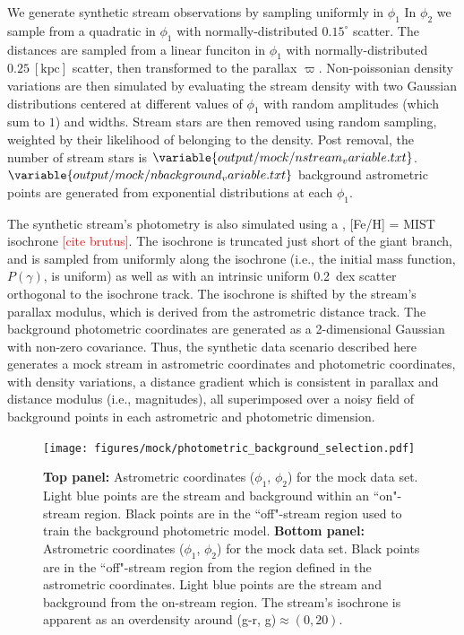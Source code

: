 \documentclass[twocolumn]{aastex631}
\newcommand{\unit}[1]{[\text{#1}]}
\newcommand{\parallax}{\varpi}
\newcommand{\TODO}[1]{{\textcolor{red}{#1}}}
\begin{document}
    We generate synthetic stream observations by sampling uniformly in $\phi_1$
    In $\phi_2$ we sample from a quadratic in $\phi_1$ with normally-distributed
    $0.15^{\circ}$ scatter.  The distances are sampled from a linear funciton in
    $\phi_1$ with normally-distributed $0.25 \ \unit{kpc}$ scatter, then
    transformed to the parallax $\parallax$.  Non-poissonian density variations
    are then simulated by evaluating the stream density with two Gaussian
    distributions centered at different values of $\phi_1$ with random
    amplitudes (which sum to $1$) and widths.  Stream stars are then removed
    using random sampling, weighted by their likelihood of belonging to the
    density. Post removal, the number of stream stars is
    $\variable{output/mock/nstream_variable.txt}$.
    $\variable{output/mock/nbackground_variable.txt}$ background astrometric points
    are generated from exponential distributions at each $\phi_1$.

    The synthetic stream's photometry is also simulated using a
    ,
    [Fe/H] =  MIST isochrone
    \TODO{[cite brutus]}. The isochrone is truncated just
    short of the giant branch, and is sampled from uniformly along the isochrone
    (i.e., the initial mass function, $P(\gamma)$, is uniform) as well as with
    an intrinsic uniform 0.2~dex scatter orthogonal to the isochrone track. The
    isochrone is shifted by the stream's parallax modulus, which is derived from
    the astrometric distance track.  The background photometric coordinates are
    generated as a 2-dimensional Gaussian with non-zero covariance.  Thus, the
    synthetic data scenario described here generates a mock stream in
    astrometric coordinates and photometric coordinates, with density
    variations, a distance gradient which is consistent in parallax and distance
    modulus (i.e., magnitudes), all superimposed over a noisy field of
    background points in each astrometric and photometric dimension.

    \begin{figure}
        \centering
        \texttt{[image: figures/mock/photometric\_background\_selection.pdf]}
        \caption{
            \textbf{Top panel:} Astrometric coordinates ($\phi_1$, $\phi_2$) for
            the mock data set.  Light blue points are the stream and background
            within an ``on"-stream region. Black points are in the ``off"-stream
            region used to train the background photometric model.
            \textbf{Bottom panel:} Astrometric coordinates ($\phi_1$, $\phi_2$)
            for the mock data set.  Black points are in the ``off"-stream region
            from the region defined in the astrometric coordinates.  Light blue
            points are the stream and background from the on-stream region. The
            stream's isochrone is apparent as an overdensity around (g-r,
            g)$\approx (0, 20)$.  }
        \label{fig:mock_data_photometric_background_selection}
    \end{figure}
\end{document}
